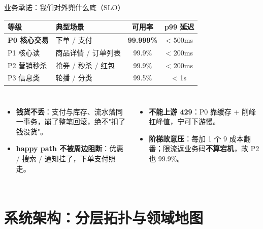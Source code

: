 \documentclass[aspectratio=169,11pt]{beamer}
\begin{document}
\begin{frame}[t,shrink]{业务承诺：我们对外兜什么底（SLO）}
  \vspace{0.1em}
  {\centering\small
  \renewcommand{\arraystretch}{1.0}
  \begin{tabular}{@{}llcc@{}}
  \toprule
  \textbf{等级} & \textbf{典型场景} & \textbf{可用率} & \textbf{p99 延迟} \\
  \midrule
  \textcolor{cBad}{\textbf{P0 核心交易}}  & 下单 / 支付       & \textbf{99.999\%} & < 500ms \\
  \textcolor{cAccent}{P1 核心读}          & 商品详情 / 订单列表 & 99.9\%  & < 200ms \\
  \textcolor{cWarn}{P2 营销秒杀}          & 抢券 / 秒杀 / 红包  & 99.9\%  & < 200ms \\
  \textcolor{cGray}{P3 信息类}            & 轮播 / 分类         & 99.5\%  & < 1s \\
  \bottomrule
  \end{tabular}\par}
  \vspace{0.15em}
  \begin{columns}[T]
    \begin{itemize}\footnotesize
      \item \textbf{钱货不丢}：支付与库存、流水落同一事务，崩了整笔回滚，绝不"扣了钱没货"。
      \item \textbf{happy path 不被周边阻断}：优惠 / 搜索 / 通知挂了，下单支付照走。
    \end{itemize}
    \begin{itemize}\footnotesize
      \item \textbf{不能上游 429}：P0 靠缓存 + 削峰扛峰值，宁可下游慢。
      \item \textbf{阶梯故意压}：每加 1 个 9 成本翻番；限流返业务码\textbf{不算宕机}，故 P2 也 99.9\%。
    \end{itemize}
  \end{columns}
  \vspace{0.3em}
\end{frame}



\section{系统架构：分层拓扑与领域地图}
\end{document}
